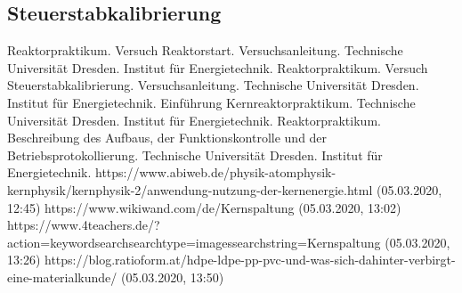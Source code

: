 \documentclass[german,  %
parskip=full,  %
]{scrartcl}
\begin{document}
\subsection{Steuerstabkalibrierung}
    \begin{thebibliography}{9}
    Reaktorpraktikum. Versuch Reaktorstart. Versuchsanleitung. Technische Universität Dresden. Institut für Energietechnik.
    Reaktorpraktikum. Versuch Steuerstabkalibrierung. Versuchsanleitung. Technische Universität Dresden. Institut für           Energietechnik.
    Einführung Kernreaktorpraktikum. Technische Universität Dresden. Institut für           Energietechnik.
    Reaktorpraktikum. Beschreibung des Aufbaus, der Funktionskontrolle und der Betriebsprotokollierung. Technische Universität Dresden. Institut für Energietechnik.
    https://www.abiweb.de/physik-atomphysik-kernphysik/kernphysik-2/anwendung-nutzung-der-kernenergie.html (05.03.2020,      12:45)
   https://www.wikiwand.com/de/Kernspaltung (05.03.2020, 13:02)
  https://www.4teachers.de/?action=keywordsearchsearchtype=imagessearchstring=Kernspaltung (05.03.2020, 13:26)
https://blog.ratioform.at/hdpe-ldpe-pp-pvc-und-was-sich-dahinter-verbirgt-eine-materialkunde/ (05.03.2020, 13:50)


    \end{thebibliography}

\end{document}
